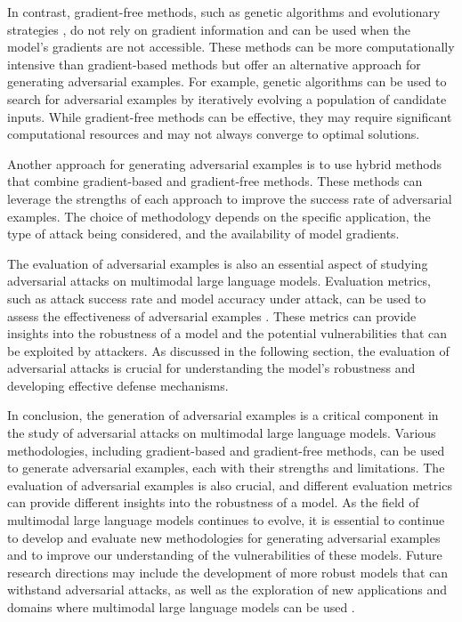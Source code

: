 \documentclass[11pt,a4paper]{article}
\begin{document}
In contrast, gradient-free methods, such as genetic algorithms and evolutionary strategies \cite{arxiv:2401.13601}, do not rely on gradient information and can be used when the model's gradients are not accessible. These methods can be more computationally intensive than gradient-based methods but offer an alternative approach for generating adversarial examples. For example, genetic algorithms can be used to search for adversarial examples by iteratively evolving a population of candidate inputs. While gradient-free methods can be effective, they may require significant computational resources and may not always converge to optimal solutions.

Another approach for generating adversarial examples is to use hybrid methods that combine gradient-based and gradient-free methods. These methods can leverage the strengths of each approach to improve the success rate of adversarial examples. The choice of methodology depends on the specific application, the type of attack being considered, and the availability of model gradients.

The evaluation of adversarial examples is also an essential aspect of studying adversarial attacks on multimodal large language models. Evaluation metrics, such as attack success rate and model accuracy under attack, can be used to assess the effectiveness of adversarial examples \cite{arxiv:2408.15769}. These metrics can provide insights into the robustness of a model and the potential vulnerabilities that can be exploited by attackers. As discussed in the following section, the evaluation of adversarial attacks is crucial for understanding the model's robustness and developing effective defense mechanisms.

In conclusion, the generation of adversarial examples is a critical component in the study of adversarial attacks on multimodal large language models. Various methodologies, including gradient-based and gradient-free methods, can be used to generate adversarial examples, each with their strengths and limitations. The evaluation of adversarial examples is also crucial, and different evaluation metrics can provide different insights into the robustness of a model. As the field of multimodal large language models continues to evolve, it is essential to continue to develop and evaluate new methodologies for generating adversarial examples and to improve our understanding of the vulnerabilities of these models. Future research directions may include the development of more robust models that can withstand adversarial attacks, as well as the exploration of new applications and domains where multimodal large language models can be used \cite{arxiv:2408.08632}.
\end{document}
